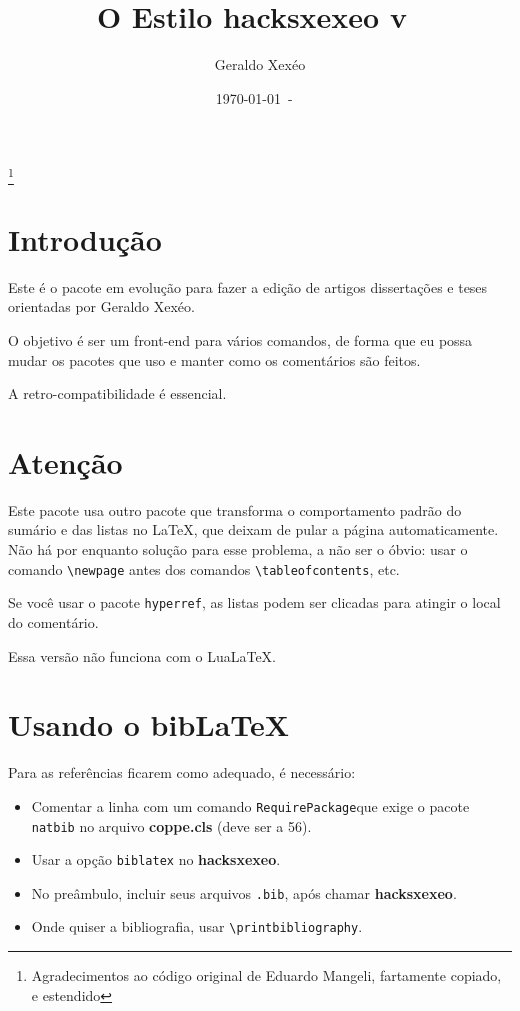 \documentclass{article}
\title{O Estilo hacksxexeo v\ \hacksxexeoversion}
\author{Geraldo Xexéo}
\date{\today\ - \ \currenttime}
\begin{document}
\maketitle
\thanks{Agradecimentos ao código original de Eduardo Mangeli, fartamente copiado, e estendido}

\section{Introdução}

Este é o pacote em evolução para fazer a edição de artigos dissertações e teses orientadas por Geraldo Xexéo.

O objetivo é ser um front-end para vários comandos, de forma que eu possa mudar os pacotes que uso e manter como os comentários são feitos.

A retro-compatibilidade é essencial.

\section{Atenção}

Este pacote usa outro pacote que transforma o comportamento padrão do sumário e das listas no \LaTeX, que deixam de pular a página automaticamente. Não há por enquanto solução para esse problema, a não ser o óbvio: usar o comando \verb!\newpage! antes dos comandos \verb!\tableofcontents!, etc.

Se você usar o pacote \verb!hyperref!, as listas podem ser clicadas para atingir o local do comentário.

Essa versão não funciona com o Lua\LaTeX.

\section{Usando o bib\LaTeX}

Para as referências ficarem como adequado, é necessário:
\begin{itemize}
    \item Comentar a linha com um comando \verb|RequirePackage|que exige o pacote \verb|natbib| no arquivo \textbf{coppe.cls} (deve ser a 56).
    \item Usar a opção \verb|biblatex| no \textbf{hacksxexeo}.
    \item No preâmbulo, incluir seus arquivos \verb|.bib|, após chamar \textbf{hacksxexeo}.
    \item Onde quiser a bibliografia, usar \verb|\printbibliography|.
\end{itemize}
    
\end{document}
